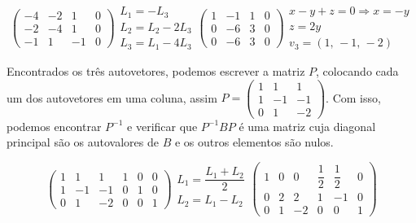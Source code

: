 \begin{enumerate}
	$$
	\begin{pmatrix}
		-4 &  -2 & 1 & 0\\
		-2 & -4 & 1 & 0\\
		-1 &  1 & -1 & 0
	\end{pmatrix}	
	\begin{array}{c}
		L_1 = - L_3\\ L_2 = L_2 - 2L_3 \\ L_3 = L_1 -4 L_3
	\end{array}
	\begin{pmatrix}
		1 & -1 & 1 & 0\\
		0 & -6 & 3 & 0\\
		0 & -6 & 3 & 0
	\end{pmatrix}
	\begin{array}{c}
		x-y+z=0 \Rightarrow x = -y \\ z = 2y \\ v_3 = (1, \, -1, \, -2)
	\end{array}
	$$
	
	Encontrados os três autovetores, podemos escrever a matriz $P$,
	colocando cada um dos autovetores em uma coluna, assim 
	$P = 
	\begin{pmatrix}
		1 & 1 & 1 \\
		1 & -1 & -1 \\
		0 & 1 & -2
	\end{pmatrix}
	$. Com isso, podemos encontrar $P^{-1}$ e verificar que
	$P^{-1}BP$ é uma matriz cuja diagonal principal são os autovalores
	de $B$ e os outros elementos são nulos.
	
	$$
	\begin{pmatrix}
		1 & 1 & 1  & 1 & 0 & 0\\
		1 & -1 & -1 & 0 & 1 & 0\\
		0 & 1 & -2 & 0 & 0 & 1
	\end{pmatrix}
	\begin{array}{c}
		L_1 = \dfrac{L_1 + L_2}{2} \\
		L_2 = L_1 - L_2 \\
	\end{array}
	\begin{pmatrix}
		1 & 0 & 0  & \dfrac{1}{2} & \dfrac{1}{2} & 0\\
		0 & 2 & 2 & 1 & -1 & 0\\
		0 & 1 & -2 & 0 & 0 & 1
	\end{pmatrix}
	$$
	

\end{enumerate}
